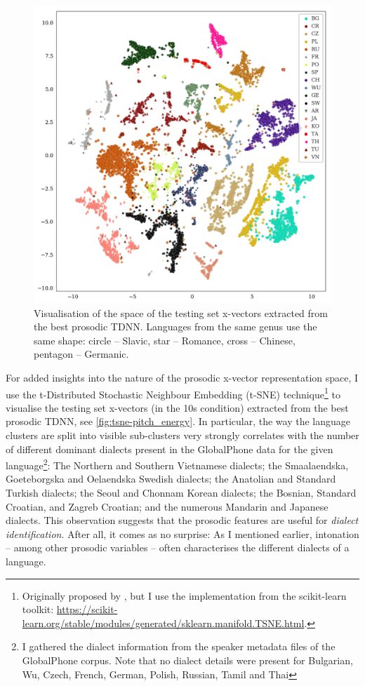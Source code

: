 \documentclass[bsc,frontabs,twoside,singlespacing,parskip,deptreport]{infthesis}
\begin{document}
{{    \begin{figure}[h!t]
      \centering
      \includegraphics[width=\textwidth]{../img/tsne-pitch_energy.png}
      \caption{Visualisation of the space of the testing set x-vectors extracted from the best prosodic TDNN. Languages from the same genus use the same shape: circle -- Slavic, star -- Romance, cross -- Chinese, pentagon -- Germanic.}
      \label{fig:tsne-pitch_energy}
    \end{figure}
    For added insights into the nature of the prosodic x-vector representation space, I use the t-Distributed Stochastic Neighbour Embedding (t-SNE) technique\footnote{Originally proposed by \citet{Maaten_Hinton_2008}, but I use the implementation from the scikit-learn toolkit: \url{https://scikit-learn.org/stable/modules/generated/sklearn.manifold.TSNE.html}.} to visualise the testing set x-vectors (in the 10s condition) extracted from the best prosodic TDNN, see \autoref{fig:tsne-pitch_energy}. In particular, the way the language clusters are split into visible sub-clusters very strongly correlates with the number of different dominant dialects present in the GlobalPhone data for the given language\footnote{I gathered the dialect information from the speaker metadata files of the GlobalPhone corpus. Note that no dialect details were present for Bulgarian, Wu, Czech, French, German, Polish, Russian, Tamil and Thai}: The Northern and Southern Vietnamese dialects; the Smaalaendska, Goeteborgska and Oelaendska Swedish dialects; the Anatolian and Standard Turkish dialects; the Seoul and Chonnam Korean dialects; the Bosnian, Standard Croatian, and Zagreb Croatian; and the numerous Mandarin and Japanese dialects. This observation suggests that the prosodic features are useful for \textit{dialect identification}. After all, it comes as no surprise: As I mentioned earlier, intonation -- among other prosodic variables -- often characterises the different dialects of a language.

}}
\end{document}

